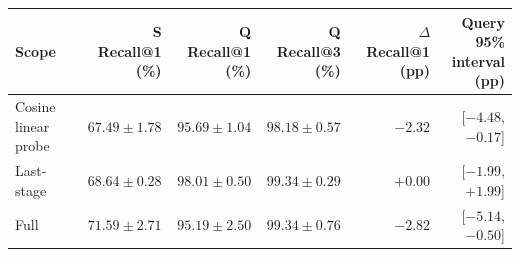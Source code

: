 \begin{tabularx}{\linewidth}{@{}Xrrrrr@{}}
\toprule
Scope & \makecell{S Recall@1\\(\%)} & \makecell{Q Recall@1\\(\%)} & \makecell{Q Recall@3\\(\%)} & \makecell{$\Delta$ Recall@1\\(pp)} & \makecell{Query 95\%\\interval (pp)} \\
\midrule
Cosine linear probe & $67.49\pm1.78$ & $95.69\pm1.04$ & $98.18\pm0.57$ & $-2.32$ & [$-4.48$, $-0.17$] \\
Last-stage & $68.64\pm0.28$ & $98.01\pm0.50$ & $99.34\pm0.29$ & $+0.00$ & [$-1.99$, $+1.99$] \\
Full & $71.59\pm2.71$ & $95.19\pm2.50$ & $99.34\pm0.76$ & $-2.82$ & [$-5.14$, $-0.50$] \\
\bottomrule
\end{tabularx}

